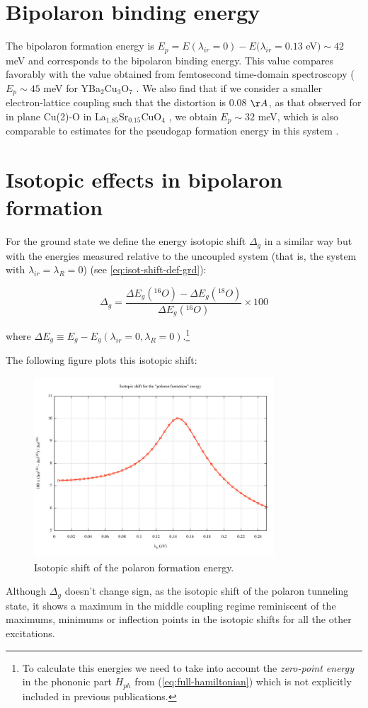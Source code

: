 \section{Bipolaron binding energy}
\label{sec:grd-binding-energy}

The bipolaron formation energy is $E_p = E(\lambda_{ir}=0)- E(\lambda_{ir}=0.13$ eV$) \sim 42$ meV and corresponds to the bipolaron binding energy. This value compares favorably with the value obtained from femtosecond time-domain spectroscopy ($E_p \sim 45$ meV for YBa$_2$Cu$_3$O$_7$ \cite{Demsar1999}. We also find that if we consider a smaller electron-lattice coupling such that the distortion is 0.08 $\AA$, as that observed for in plane Cu(2)-O in La$_{1.85}$Sr$_{0.15}$CuO$_4$ \cite{Bianconi1996}, we obtain $E_p \sim 32$ meV, which is also comparable to estimates for the pseudogap formation energy in this system \cite{Kusar2005}.

\section{Isotopic effects in bipolaron formation}
\label{sec:grd-isotopic}

For the ground state we define the energy isotopic shift $\Delta_g$ in a similar way but with the energies measured relative to the uncoupled system (that is, the system with $\lambda_{ir}=\lambda_R=0$) (see \ref{eq:isot-shift-def-grd}):

\begin{equation}
  \Delta_g = \frac{\Delta E_g(^{16}O)- \Delta E_g(^{18}O)}{\Delta E_g(^{16}O)} \times 100 
\end{equation}

where $\Delta E_g \equiv E_g - E_g(\lambda_{ir}=0, \lambda_R=0)$.\footnote{To calculate this energies we need to take into account the \textit{zero-point energy} in the phononic part $H_{ph}$ from (\ref{eq:full-hamiltonian}) which is not explicitly included in previous publications.}

The following figure plots this isotopic shift:

\begin{figure}[ht!]
  \centering
  \includegraphics[width=0.8\textwidth]{images/isot_polaron_formation.jpg}
  \caption{Isotopic shift of the polaron formation energy.}
  \label{fig:isot_polaron_formation}
\end{figure}

Although $\Delta_g$ doesn't change sign, as the isotopic shift of the polaron tunneling state, it shows a maximum in the middle coupling regime reminiscent of the maximums, minimums or inflection points in the isotopic shifts for all the other excitations.